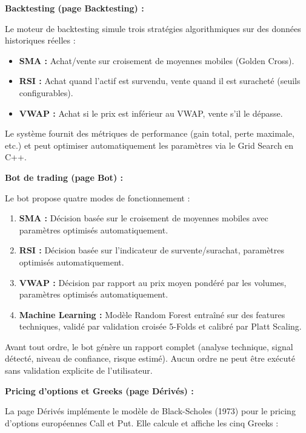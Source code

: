 \documentclass[a4paper, 12pt, twoside]{article}
\begin{document}
\textbf{Backtesting (page Backtesting) :}

Le moteur de backtesting simule trois stratégies algorithmiques sur des
données historiques réelles :

\begin{itemize}
    \item \textbf{SMA :} Achat/vente sur croisement de moyennes mobiles
          (Golden Cross).
    \item \textbf{RSI :} Achat quand l'actif est survendu, vente quand
          il est suracheté (seuils configurables).
    \item \textbf{VWAP :} Achat si le prix est inférieur au VWAP, vente
          s'il le dépasse.
\end{itemize}

Le système fournit des métriques de performance (gain total, perte
maximale, etc.) et peut optimiser automatiquement les paramètres via le
Grid Search en C++.

\textbf{Bot de trading (page Bot) :}

Le bot propose quatre modes de fonctionnement :

\begin{enumerate}
    \item \textbf{SMA :} Décision basée sur le croisement de moyennes
          mobiles avec paramètres optimisés automatiquement.
    \item \textbf{RSI :} Décision basée sur l'indicateur de
          survente/surachat, paramètres optimisés automatiquement.
    \item \textbf{VWAP :} Décision par rapport au prix moyen pondéré
          par les volumes, paramètres optimisés automatiquement.
    \item \textbf{Machine Learning :} Modèle Random Forest entraîné
          sur des features techniques, validé par validation croisée
          5-Folds et calibré par Platt Scaling.
\end{enumerate}

Avant tout ordre, le bot génère un rapport complet (analyse technique,
signal détecté, niveau de confiance, risque estimé). Aucun ordre ne peut
être exécuté sans validation explicite de l'utilisateur.

\textbf{Pricing d'options et Greeks (page Dérivés) :}

La page Dérivés implémente le modèle de Black-Scholes (1973) pour le
pricing d'options européennes Call et Put. Elle calcule et affiche les
cinq Greeks :
\end{document}

